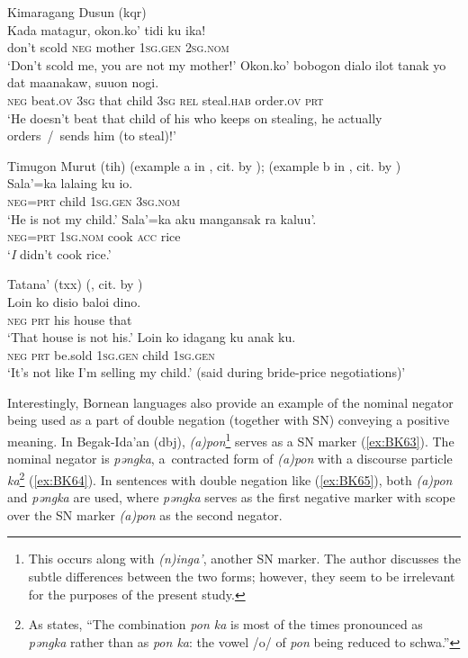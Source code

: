\documentclass[output=paper]{langsci/langscibook}
\begin{document}
\ea Kimaragang Dusun (kqr) \citep[7-8]{kroeger2014a} \label{ex:BK60}\\
  \ea
	\gll Kada		matagur,	okon.ko’		tidi		ku			ika!\\
	don’t		scold			\textsc{neg}			mother	\textsc{1sg.gen}	\textsc{2sg.nom}\\
	\glt `Don’t scold me, you are not my mother!'
  \ex
	\gll Okon.ko’	bobogon			dialo		ilot	tanak		yo	dat		maanakaw,		suuon		nogi.\\
	\textsc{neg}			beat.\textsc{ov}			\textsc{3sg}		that	child		\textsc{3sg}	\textsc{rel}	steal.\textsc{hab}		order.\textsc{ov}		\textsc{prt}\\
	\glt `He doesn’t beat that child of his who keeps on stealing, he actually orders / sends him (to steal)!'
\z \z

\ea Timugon Murut (tih) (example a in \citealp[10]{brewis1988a}, cit. by \citealp[8]{kroeger2014a}); (example b in \citealp[612]{brewis2004a}, cit. by \citealp[8]{kroeger2014a}) \label{ex:BK61}\\
  \ea
	\gll Sala’=ka	lalaing	ku				io.\\
	\textsc{neg=prt}	child		\textsc{1sg.gen}		\textsc{3sg.nom}\\
	\glt `He is not my child.'
  \ex
	\gll Sala’=ka	aku			mangansak		ra		kaluu’.\\
	\textsc{neg=prt}	\textsc{1sg.nom}	cook				\textsc{acc}	rice\\
	\glt `\textit{I} didn’t cook rice.'
\z \z

\ea Tatana’ (txx) (\citealp[6, 44]{chan1989a}, cit. by \citealp[11]{kroeger2014a}) \label{ex:BK62}\\
  \ea
	\gll Loin	ko			disio	baloi		dino.\\
	\textsc{neg}	\textsc{prt}	his		house		that\\
	\glt `That house is not his.'
  \ex
	\gll Loin	ko			idagang	ku				anak	ku.\\
	\textsc{neg}	\textsc{prt}	be.sold	\textsc{1sg.gen}		child	\textsc{1sg.gen}\\
	\glt `It’s not like I’m selling my child.’ (said during bride-price negotiations)'
\z \z

Interestingly, Bornean languages also provide an example of the nominal negator being used as a part of double negation (together with SN) conveying a positive meaning. In Begak-Ida’an (dbj), \textit{(a)pon}\footnote{This occurs along with \textit{(n)inga’}, another SN marker. The author discusses the subtle differences between the two forms; however, they seem to be irrelevant for the purposes of the present study.} serves as a SN marker (\ref{ex:BK63}). The nominal negator is \textit{pǝngka}, a contracted form of \textit{(a)pon} with a discourse particle \textit{ka}\footnote{As \citet[304]{goudswaard2005a} states, “The combination \textit{pon ka} is most of the times pronounced as \textit{pǝngka} rather than as \textit{pon ka}: the vowel /o/ of \textit{pon} being reduced to schwa.”} (\ref{ex:BK64}). In sentences with double negation like (\ref{ex:BK65}), both \textit{(a)pon} and \textit{pǝngka} are used, where \textit{pǝngka} serves as the first negative marker with scope over the SN marker \textit{(a)pon} as the second negator.
\end{document}
